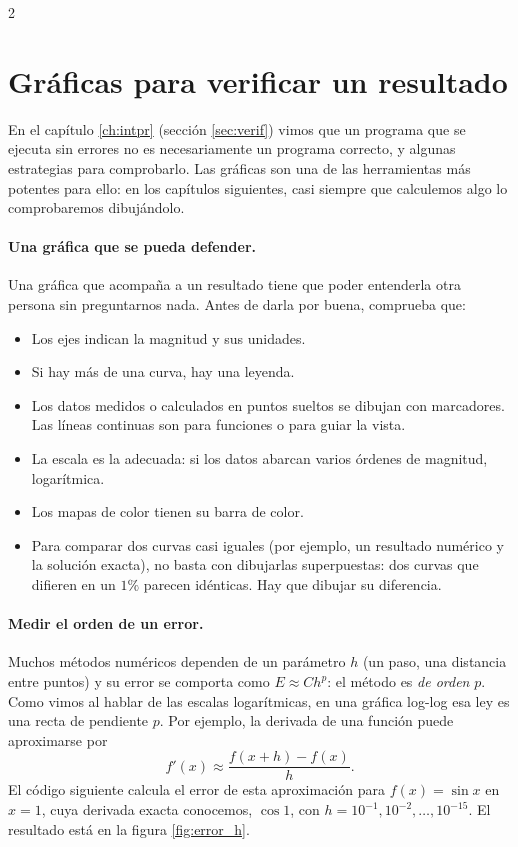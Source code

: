 \begin{paracol}{2}
\section[Gráficas para verificar un resultado]{Gráficas para verificar un resultado}\label{sec:graf_verif}
En el capítulo \ref{ch:intpr} (sección \ref{sec:verif}) vimos que un programa que se ejecuta sin errores no es necesariamente un programa correcto, y algunas estrategias para comprobarlo. Las gráficas son una de las herramientas más potentes para ello: en los capítulos siguientes, casi siempre que calculemos algo lo comprobaremos dibujándolo.

\paragraph{Una gráfica que se pueda defender.} Una gráfica que acompaña a un resultado tiene que poder entenderla otra persona sin preguntarnos nada. Antes de darla por buena, comprueba que:
\begin{itemize}
\item Los ejes indican la magnitud y sus unidades.
\item Si hay más de una curva, hay una leyenda.
\item Los datos medidos o calculados en puntos sueltos se dibujan con marcadores. Las líneas continuas son para funciones o para guiar la vista.
\item La escala es la adecuada: si los datos abarcan varios órdenes de magnitud, logarítmica.
\item Los mapas de color tienen su barra de color.
\item Para comparar dos curvas casi iguales (por ejemplo, un resultado numérico y la solución exacta), no basta con dibujarlas superpuestas: dos curvas que difieren en un $1\%$ parecen idénticas. Hay que dibujar su diferencia.
\end{itemize}

\paragraph{Medir el orden de un error.} Muchos métodos numéricos dependen de un parámetro $h$ (un paso, una distancia entre puntos) y su error se comporta como $E\approx Ch^p$: el método es \emph{de orden} $p$. Como vimos al hablar de las escalas logarítmicas, en una gráfica log-log esa ley es una recta de pendiente $p$. Por ejemplo, la derivada de una función puede aproximarse por
$$f'(x)\approx\frac{f(x+h)-f(x)}{h}.$$
El código siguiente calcula el error de esta aproximación para $f(x)=\sin x$ en $x=1$, cuya derivada exacta conocemos, $\cos 1$, con $h=10^{-1}, 10^{-2},\ldots,10^{-15}$. El resultado está en la figura \ref{fig:error_h}.
\switchcolumn

\end{paracol}
